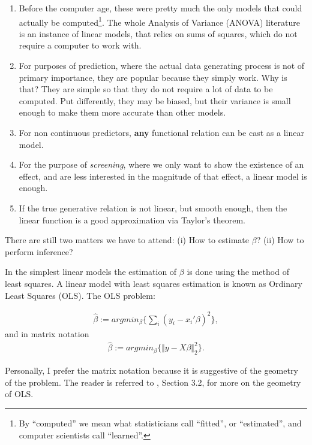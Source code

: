 \documentclass[]{book}
\theoremstyle{definition}
\theoremstyle{definition}
\theoremstyle{definition}
\theoremstyle{remark}
\let\BeginKnitrBlock\begin \let\EndKnitrBlock\end
\begin{document}
\begin{enumerate}
\def\labelenumi{\arabic{enumi}.}
\item
  Before the computer age, these were pretty much the only models that could actually be computed\footnote{By ``computed'' we mean what statisticians call ``fitted'', or ``estimated'', and computer scientists call ``learned''.}.
  The whole Analysis of Variance (ANOVA) literature is an instance of linear models, that relies on sums of squares, which do not require a computer to work with.
\item
  For purposes of prediction, where the actual data generating process is not of primary importance, they are popular because they simply work.
  Why is that?
  They are simple so that they do not require a lot of data to be computed.
  Put differently, they may be biased, but their variance is small enough to make them more accurate than other models.
\item
  For non continuous predictors, \textbf{any} functional relation can be cast as a linear model.
\item
  For the purpose of \emph{screening}, where we only want to show the existence of an effect, and are less interested in the magnitude of that effect, a linear model is enough.
\item
  If the true generative relation is not linear, but smooth enough, then the linear function is a good approximation via Taylor's theorem.
\end{enumerate}

There are still two matters we have to attend:
(i) How to estimate \(\beta\)?
(ii) How to perform inference?

In the simplest linear models the estimation of \(\beta\) is done using the method of least squares. A linear model with least squares estimation is known as Ordinary Least Squares (OLS).
The OLS problem:

\begin{align}
  \hat \beta:= argmin_\beta \{ \sum_i (y_i-x_i'\beta)^2 \},
  \label{eq:ols}
\end{align}
and in matrix notation
\begin{align}
  \hat \beta:= argmin_\beta \{ \Vert y-X\beta \Vert^2_2 \}.
  \label{eq:ols-matrix}
\end{align}

\BeginKnitrBlock{remark}
{}Personally, I prefer the matrix notation because it is suggestive of the geometry of the problem.
The reader is referred to \citet{friedman2001elements}, Section 3.2, for more on the geometry of OLS.
\EndKnitrBlock{remark}
\end{document}
